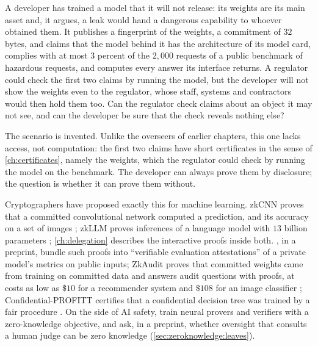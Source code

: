 \begin{refsection}
\begin{oversight}
A developer has trained a model that it will not release: its weights are its main asset and, it argues, a leak would hand a dangerous capability to whoever obtained them. It publishes a fingerprint of the weights, a commitment of $32$ bytes, and claims that the model behind it has the architecture of its model card, complies with at most $3$ percent of the $2{,}000$ requests of a public benchmark of hazardous requests, and computes every answer its interface returns. A regulator could check the first two claims by running the model, but the developer will not show the weights even to the regulator, whose staff, systems and contractors would then hold them too. Can the regulator check claims about an object it may not see, and can the developer be sure that the check reveals nothing else?
\end{oversight}

The scenario is invented. Unlike the overseers of earlier chapters, this one lacks access, not computation: the first two claims have short certificates in the sense of \cref{ch:certificates}, namely the weights, which the regulator could check by running the model on the benchmark. The developer can always prove them by disclosure; the question is whether it can prove them without.

Cryptographers have proposed exactly this for machine learning. zkCNN proves that a committed convolutional network computed a prediction, and its accuracy on a set of images \parencite{LiuXieZhang2021}; zkLLM proves inferences of a language model with $13$ billion parameters \parencite{SunLiZhang2024}; \cref{ch:delegation} describes the interactive proofs inside both. \Textcite{SouthEtAl2024}, in a preprint, bundle such proofs into ``verifiable evaluation attestations'' of a private model's metrics on public inputs; ZkAudit proves that committed weights came from training on committed data and answers audit questions with proofs, at costs as low as $\$10$ for a recommender system and $\$108$ for an image classifier \parencite{WaiwitlikhitEtAl2024}; Confidential-PROFITT certifies that a confidential decision tree was trained by a fair procedure \parencite{ShamsabadiEtAl2023}. On the side of AI safety, \textcite{HammondAdamDay2025} train neural provers and verifiers with a zero-knowledge objective, and \textcite{ChiesaGuanYildiz2026} ask, in a preprint, whether oversight that consults a human judge can be zero knowledge (\cref{sec:zeroknowledge:leaves}).


\end{refsection}
